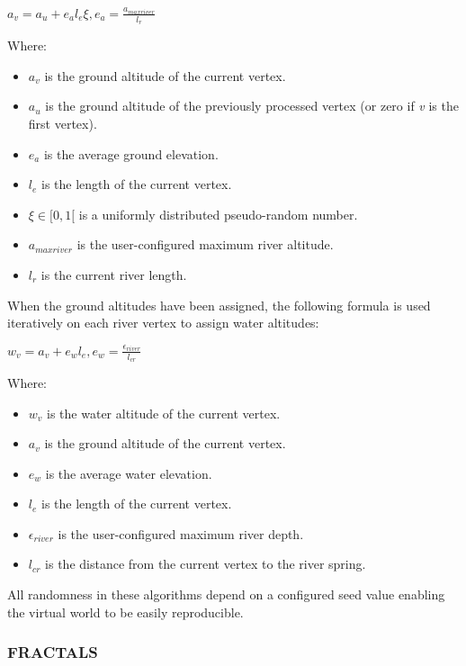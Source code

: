 \begin{center}
$a_{v} = a_{u} + e_{a}l_{e}\xi , e_{a} = \frac{a_{maxriver}}{l_{r}} $ \\
\end{center}

Where:
\begin{itemize}
\item $a_{v}$ is the ground altitude of the current vertex.
\item $a_{u}$ is the ground altitude of the previously processed vertex (or zero if \textit{v} is the first vertex).
\item $e_{a}$ is the average ground elevation.
\item $l_{e}$ is the length of the current vertex.
\item $\xi \in [0,1[$ is a uniformly distributed pseudo-random number.
\item $a_{maxriver}$ is the user-configured maximum river altitude.
\item $l_{r}$ is the current river length.
\end{itemize}

When the ground altitudes have been assigned, the following formula is used iteratively on each river vertex to assign water altitudes:

\begin{center}
$w_{v} = a_{v} + e_{w}l_{e}, e_{w} = \frac{\epsilon_{river}}{l_{cr}} $
\end{center}

Where:
\begin{itemize}
\item $w_{v}$ is the water altitude of the current vertex.
\item $a_{v}$ is the ground altitude of the current vertex.
\item $e_{w}$ is the average water elevation.
\item $l_{e}$ is the length of the current vertex.
\item $\epsilon_{river}$ is the user-configured maximum river depth.
\item $l_{cr}$ is the distance from the current vertex to the river spring.
\end{itemize}

All randomness in these algorithms depend on a configured seed value enabling the virtual world to be easily reproducible.  \\

\subsubsection{FRACTALS}

